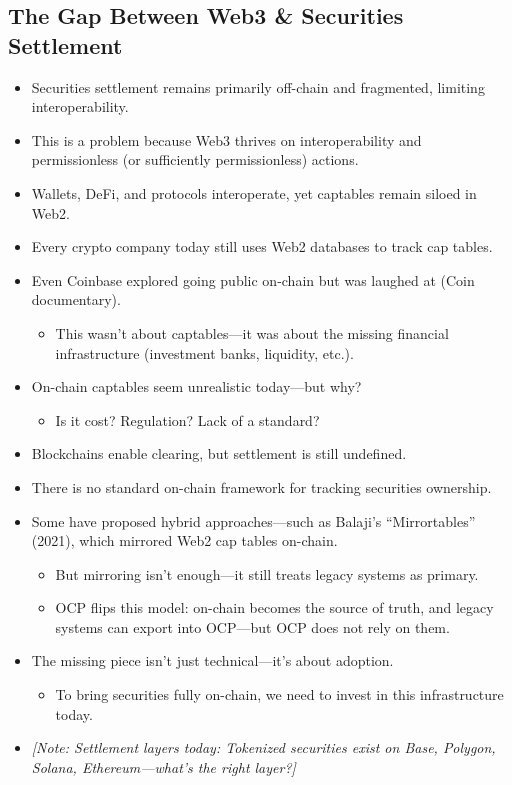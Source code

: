\documentclass[11pt,a4paper]{article}
\begin{document}
\subsection{The Gap Between Web3 \& Securities Settlement}
\begin{itemize}
    \item Securities settlement remains primarily off-chain and fragmented, limiting interoperability.
    \item This is a problem because Web3 thrives on interoperability and permissionless (or sufficiently permissionless) actions.
    \item Wallets, DeFi, and protocols interoperate, yet captables remain siloed in Web2.
    \item Every crypto company today still uses Web2 databases to track cap tables.
    \item Even Coinbase explored going public on-chain but was laughed at (Coin documentary).
    \begin{itemize}
        \item This wasn't about captables---it was about the missing financial infrastructure (investment banks, liquidity, etc.).
    \end{itemize}
    \item On-chain captables seem unrealistic today---but why?
    \begin{itemize}
        \item Is it cost? Regulation? Lack of a standard?
    \end{itemize}
    \item Blockchains enable clearing, but settlement is still undefined.
    \item There is no standard on-chain framework for tracking securities ownership.
    \item Some have proposed hybrid approaches---such as Balaji's ``Mirrortables'' (2021), which mirrored Web2 cap tables on-chain.
    \begin{itemize}
        \item But mirroring isn't enough---it still treats legacy systems as primary.
        \item OCP flips this model: on-chain becomes the source of truth, and legacy systems can export into OCP---but OCP does not rely on them.
    \end{itemize}
    \item The missing piece isn't just technical---it's about adoption.
    \begin{itemize}
        \item To bring securities fully on-chain, we need to invest in this infrastructure today.
    \end{itemize}
    \item \textit{[Note: Settlement layers today: Tokenized securities exist on Base, Polygon, Solana, Ethereum---what's the right layer?]}
\end{itemize}
\end{document}

